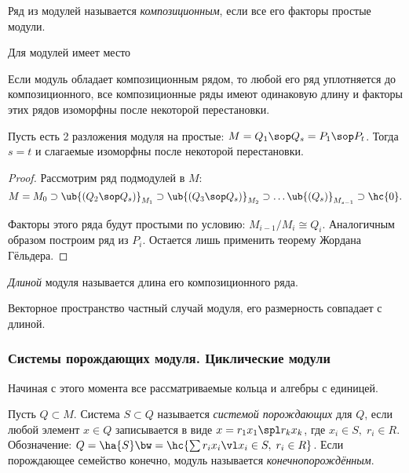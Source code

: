 \documentclass[a4paper]{article}
\begin{document}
\begin{df}
Ряд из модулей называется \emph{композиционным}, если все его факторы простые модули.
\end{df}

Для модулей имеет место
\begin{theorem}
Если модуль обладает композиционным рядом, то любой его ряд уплотняется до композиционного, все
композиционные ряды имеют одинаковую длину и факторы этих рядов изоморфны после некоторой перестановки.
\end{theorem}

\begin{imp}
Пусть есть 2 разложения модуля на простые: $M= Q_1 \sop Q_s=P_1 \sop P_t$. Тогда $s=t$ и слагаемые  изоморфны
после некоторой перестановки.
\end{imp}
\begin{proof}
Рассмотрим ряд подмодулей в $M$:
$$M=M_0 \supset \ub{(Q_2 \sop Q_s)}_{M_1} \supset \ub{(Q_3 \sop Q_s)}_{M_2} \supset \ldots \ub{(Q_s)}_{M_{s-1}} \supset \hc{0}.$$

Факторы этого ряда будут простыми по условию: $M_{i-1}/M_i\cong Q_i$. Аналогичным образом построим  ряд из
$P_i$. Остается лишь применить теорему Жордана Гёльдера.
\end{proof}

\begin{df}
\emph{Длиной} модуля называется длина его композиционного ряда.
\end{df}

\begin{note}
Векторное пространство частный случай модуля, его размерность совпадает с длиной.
\end{note}

\subsubsection{Системы порождающих модуля. Циклические модули}

Начиная с этого момента все рассматриваемые кольца и алгебры с единицей.

\begin{df}
Пусть $Q \subset M$. Система $S \subset Q$ называется \emph{системой порождающих} для $Q$, если  любой
элемент $x \in Q$ записывается в виде $x=r_1 x_1  \spl  r_k x_k$, где $x_i \in S, \; r_i \in R$. Обозначение:
$Q=\ha{S}\bw=\hc{\sum r_i x_i \vl x_i \in S, \; r_i \in R}$. Если порождающее семейство конечно, модуль
называется \emph{конечнопорождённым}.
\end{df}
\end{document}
